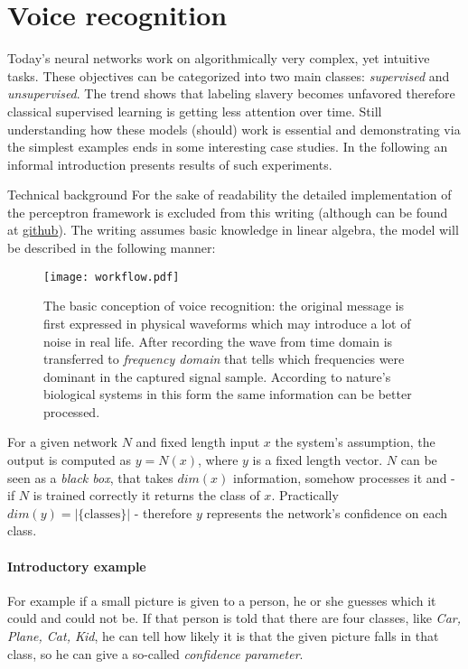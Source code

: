 \section{Voice recognition}

Today's neural networks work on algorithmically very complex, yet intuitive tasks. These objectives can be categorized into two main classes: \emph{supervised} and \emph{unsupervised}. The trend shows that labeling slavery becomes unfavored therefore classical supervised learning is getting less attention over time. Still understanding how these models (should) work is essential and demonstrating via the simplest examples ends in some interesting case studies. In the following an informal introduction presents results of such experiments.

    {Technical background}
For the sake of readability the detailed implementation of the perceptron framework is excluded from this writing (although can be found at \href{https://github.com/botcs/deepvision/tree/master/demo/audio}{github}). 
The writing assumes basic knowledge in linear algebra, the model will be described in the following manner: \\
 
\begin{figure}
	\centering
	\texttt{[image: workflow.pdf]}
	\caption{
	The basic conception of voice recognition: 
	the original message is first expressed in physical waveforms which may introduce a lot of noise in real life. 
	After recording the wave from time domain is transferred to \emph{frequency domain} that tells which frequencies were dominant in the captured signal sample.
	According to nature's biological systems in this form the same information can be better processed.
	}
	\label{fig:workflow}
\end{figure}

For a given network $N$ and fixed length input $x$ the system's assumption, the output is computed as $y=N(x)$, where $y$ is a fixed length vector.
$N$ can be seen as a \emph{black box}, that takes $dim(x)$ information, somehow processes it and - if $N$ is trained correctly it returns the class of $x$. Practically $dim(y)=|\{\textrm{classes}\}|$ - therefore $y$ represents the network's confidence on each class.

\paragraph{Introductory example}
For example if a small picture is given to a person, he or she guesses which it could and could not be. If that person is told that there are four classes, like \emph{Car, Plane, Cat, Kid}, he can tell how likely it is that the given picture falls in that class, so he can give a so-called \emph{confidence parameter}.

